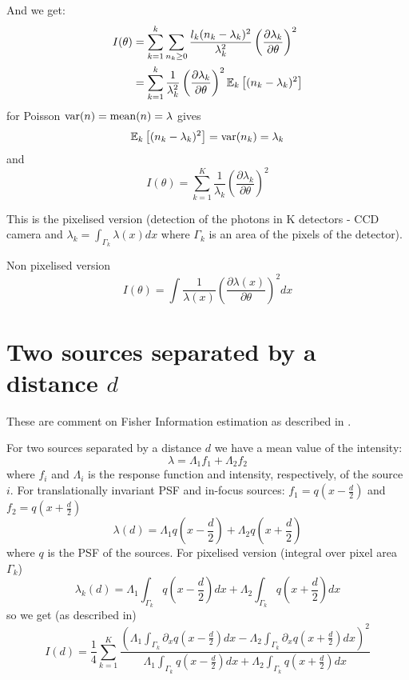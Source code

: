 And we get:
%
\begin{align*}
	I(\theta) 
	& =\sum_{k=1}^k\sum_{n_k\geq0}\frac{l_k(n_k-\lambda_k)^2}{\lambda_k^2}\left(\frac{\partial\lambda_k}{\partial\theta}\right)^2\\
	& =\sum_{k=1}^k\frac{1}{\lambda_k^2}\left(\frac{\partial\lambda_k}{\partial\theta}\right)^2\mathbb{E}_k\left[(n_k-\lambda_k)^2\right]
\end{align*}
%
for Poisson $\mathrm{var}(n)=\mathrm{mean}(n)=\lambda$ gives 
%
\begin{equation}
	\mathbb{E}_k\left[(n_k-\lambda_k)^2\right]=\mathrm{var}(n_k)=\lambda_k
\end{equation}
%
and 
%
\begin{equation}
	I(\theta)=\sum_{k=1}^{K}\frac{1}{\lambda_k}\left(\frac{\partial\lambda_k}{\partial\theta}\right)^2\label{eq:Fisher Info for Poisson}
\end{equation}

This is the pixelised version (detection of the photons in K detectors - CCD camera and $\lambda_k=\int_{\Gamma_k}\lambda(x)dx$ where $\Gamma_k$ is an area of the pixels of the detector). 

Non pixelised version \cite{Ram2006}
%
\begin{equation}
	I(\theta)=\int\frac{1}{\lambda(x)}\left(\frac{\partial\lambda(x)}{\partial\theta}\right)^2dx
\end{equation}

\clearpage{}
\section{Two sources separated by a distance $d$\label{sub:Two-sources-separated}}

These are comment on Fisher Information estimation as described in \cite{Ram2006}.

For two sources separated by a distance $d$ we have a mean value of the intensity:
%
\begin{equation}
	\lambda=\Lambda_1f_1+\Lambda_2f_2
\end{equation}
%
where $f_i$ and $\Lambda_i$ is the response function and intensity, respectively, of the source $i$. For translationally invariant PSF and in-focus sources: $f_1=q(x-\frac{d}{2})$ and $f_2=q(x+\frac{d}{2})$
%
\begin{equation}
	\lambda(d)=\Lambda_1q(x-\frac{d}{2})+\Lambda_2q(x+\frac{d}{2})
\end{equation}
%
where $q$ is the PSF of the sources. For pixelised version (integral over pixel area $\Gamma_k$)
%
\begin{equation}
	\lambda_k(d)=\Lambda_1\int_{\Gamma_k}q(x-\frac{d}{2})dx+\Lambda_2\int_{\Gamma_k}q(x+\frac{d}{2})dx
\end{equation}
%
so we get (as described in\cite{Ram2006})
%
\begin{equation}
	I(d)=\frac{1}{4}\sum_{k=1}^{K}\frac{\left(\Lambda_1\int_{\Gamma_k}\partial_{x}q(x-\frac{d}{2})dx-\Lambda_2\int_{\Gamma_k}\partial_{x}q(x+\frac{d}{2})dx\right)^2}{\Lambda_1\int_{\Gamma_k}q(x-\frac{d}{2})dx+\Lambda_2\int_{\Gamma_k}q(x+\frac{d}{2})dx}
	\label{eq:Fisher Info Pixelised - Ram}
\end{equation}


